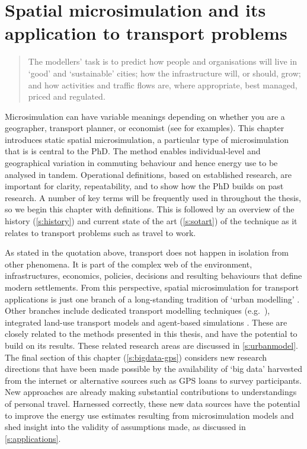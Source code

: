 
\chapter{Spatial microsimulation and its application to transport problems}
\label{Chapter3}

\begin{quote}
The modellers' task is to predict how people and organisations will live in
`good' and `sustainable' cities; how the infrastructure will, or should, grow;
and how activities and traffic flows are, where appropriate, best managed,
priced and regulated.
\end{quote}

Microsimulation can have variable meanings depending on whether you are a
geographer, transport planner, or economist
(see \citealp{Ballas2005b, Liu2006, Bourguignon2006} for examples).
This chapter introduces static spatial microsimulation, a particular type of
microsimulation that is is central to the PhD. The method enables
individual-level and geographical variation in commuting behaviour and hence
energy use to be analysed in tandem. Operational definitions, based on
established research, are important for clarity, repeatability, and to
show how the PhD builds on past research. A number of key terms will be
frequently used in throughout the thesis, so we begin this chapter with
definitions.
This is followed by an overview of the history (\cref{s:history}) and current
state of the art (\cref{s:sotart}) of the technique as it relates to transport
problems such as travel to work.

As stated in the quotation above, transport does not happen in isolation from
other phenomena. It is part of the complex web of the environment,
infrastructures, economics, policies, decisions and
resulting behaviours that define modern settlements. From this
perspective, spatial microsimulation for transport applications is just one
branch of a long-standing tradition of `urban modelling'
\citep{batty1976urban}.
Other branches include dedicated transport modelling techniques
(e.g.~\citealp{SATURN2012}), integrated land-use transport  models
\citep{Wegener2009} and agent-based simulations \citep{Gilbert2008-abm}.
These are
closely related to the methods presented in this thesis, and have
the potential to build on its results. These related research areas are
discussed in \cref{s:urbanmodel}. The final section of
this chapter (\cref{s:bigdata-gps}) considers new research directions that have
been made possible by  the availability of `big data' harvested from the
internet or alternative sources such as GPS loans to survey participants.
New approaches are already
making substantial contributions to understandings of personal travel.
Harnessed correctly, these new data sources have the potential to improve the
energy use estimates resulting from microsimulation models and shed insight into
the validity of assumptions made, as discussed in \cref{s:applications}.

